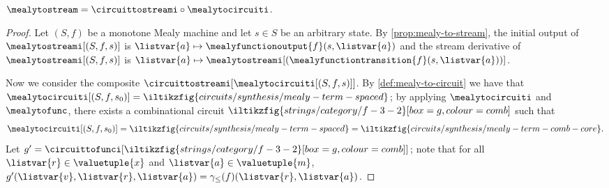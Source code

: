 \documentclass{lmcs}
\begin{document}
\begin{thm}\label{thm:mealy-to-circuit}
    \(
    \mealytostream = \circuittostreami \circ \mealytocircuiti
    \).
\end{thm}
\begin{proof}
    Let \((S ,f)\) be a monotone Mealy machine and let \(s \in S\) be an arbitrary
    state.
    By \autoref{prop:mealy-to-stream}, the initial output of
    \(\mealytostreami[(S, f, s)]\) is
    \(\listvar{a} \mapsto \mealyfunctionoutput{f}\mleft(s, \listvar{a}\mright)\)
    and the stream derivative of \(\mealytostreami[(S, f, s)]\) is \(
    \listvar{a}
    \mapsto
    \mealytostreami[(\mealyfunctiontransition{f}\mleft(s, \listvar{a}\mright))]
    \).

    Now we consider the composite
    \(\circuittostreami[\mealytocircuiti[(S, f, s)]]\).
    By \autoref{def:mealy-to-circuit} we have that \(
    \mealytocircuiti[(S, f, s_0)]
    =
    \iltikzfig{circuits/synthesis/mealy-term-spaced}
    \); by applying \(\mealytocircuiti\) and \(\mealytofunc\),
    there exists a combinational circuit \(
    \iltikzfig{strings/category/f-3-2}[box=g,colour=comb]
    \) such that \[
        \mealytocircuiti[(S, f, s_0)]
        =
        \iltikzfig{circuits/synthesis/mealy-term-spaced}
        =
        \iltikzfig{circuits/synthesis/mealy-term-comb-core}.
    \]
    Let \(
    g^\prime
    =
    \circuittofunci[\iltikzfig{strings/category/f-3-2}[box=g,colour=comb]]
    \); note that for all \(\listvar{r} \in \valuetuple{x}\) and
    \(\listvar{a} \in \valuetuple{m}\),
    \(g^\prime(\listvar{v}, \listvar{r}, \listvar{a})
    =
    \gamma_\leq(f)(\listvar{r},\listvar{a})
    \).


\end{proof}
\end{document}
